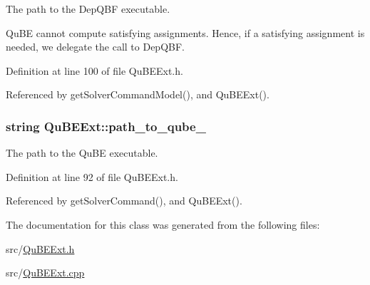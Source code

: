 The path to the Dep\-Q\-B\-F executable. 

Qu\-B\-E cannot compute satisfying assignments. Hence, if a satisfying assignment is needed, we delegate the call to Dep\-Q\-B\-F. 

Definition at line 100 of file Qu\-B\-E\-Ext.\-h.



Referenced by get\-Solver\-Command\-Model(), and Qu\-B\-E\-Ext().

\hypertarget{classQuBEExt_a02646118beb978edff16fc0094a798f8}{
\subsubsection[{path\-\_\-to\-\_\-qube\-\_\-}]{\setlength{\rightskip}{0pt plus 5cm}string Qu\-B\-E\-Ext\-::path\-\_\-to\-\_\-qube\-\_\-\hspace{0.3cm}{\ttfamily [protected]}}}\label{classQuBEExt_a02646118beb978edff16fc0094a798f8}


The path to the Qu\-B\-E executable. 



Definition at line 92 of file Qu\-B\-E\-Ext.\-h.



Referenced by get\-Solver\-Command(), and Qu\-B\-E\-Ext().



The documentation for this class was generated from the following files\-:\begin{DoxyCompactItemize}
\item 
src/\hyperlink{QuBEExt_8h}{Qu\-B\-E\-Ext.\-h}\item 
src/\hyperlink{QuBEExt_8cpp}{Qu\-B\-E\-Ext.\-cpp}\end{DoxyCompactItemize}
